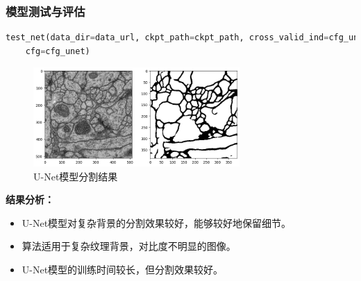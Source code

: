 \documentclass[12pt]{ctexart}
\begin{document}
\subsubsection*{模型测试与评估}

\begin{lstlisting}[language=Python]
    test_net(data_dir=data_url, ckpt_path=ckpt_path, cross_valid_ind=cfg_unet['cross_valid_ind'],
    cfg=cfg_unet)
\end{lstlisting}

\begin{figure}[H]
    \centering
    \includegraphics[width=0.7\textwidth]{image/2.png}
    \caption{U-Net模型分割结果}
\end{figure}

\textbf{结果分析：}
\begin{itemize}
    \item U-Net模型对复杂背景的分割效果较好，能够较好地保留细节。
    \item 算法适用于复杂纹理背景，对比度不明显的图像。
    \item U-Net模型的训练时间较长，但分割效果较好。
\end{itemize}
\end{document}

